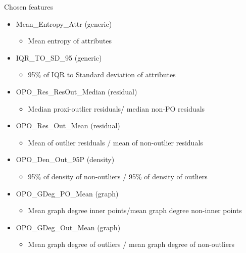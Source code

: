 \documentclass{beamer}
\begin{document}
\begin{darkframes}
\begin{frame}{Chosen features}
\begin{itemize}
    \item Mean\_Entropy\_Attr (generic) 
    \begin{itemize}
        \item     Mean entropy of attributes
    \end{itemize}
    \item IQR\_TO\_SD\_95 (generic)   
      \begin{itemize}
        \item     95\% of IQR to Standard deviation of attributes
    \end{itemize}
	\item OPO\_Res\_ResOut\_Median (residual) 
	\begin{itemize}
	    \item 	Median proxi-outlier residuals/ median non-PO residuals
	\end{itemize}
	\item OPO\_Res\_Out\_Mean (residual) 
	\begin{itemize}
	    \item 	Mean of outlier residuals / mean of non-outlier residuals
	\end{itemize}
	\item OPO\_Den\_Out\_95P (density) 
	\begin{itemize}
	    \item 	95\% of density of non-outliers / 95\% of density of outliers
	\end{itemize}
	\item OPO\_GDeg\_PO\_Mean (graph) 
	\begin{itemize}
	    \item 	Mean graph degree inner points/mean graph degree non-inner points
	\end{itemize}
	\item OPO\_GDeg\_Out\_Mean (graph) 
	\begin{itemize}
	    \item 	Mean graph degree of outliers / mean graph degree of non-outliers
	\end{itemize}
\end{itemize}
    
\end{frame}
    

\end{darkframes}
\end{document}
